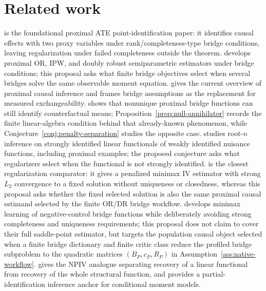 \documentclass[11pt]{article}
\theoremstyle{definition}
\theoremstyle{plain}
\theoremstyle{remark}
\begin{document}
\section{Related work}
\citet{MiaoGengTchetgen2018Biometrika} is the foundational proximal ATE
point-identification paper: it identifies causal effects with two proxy
variables under rank/completeness-type bridge conditions, leaving
regularization under failed completeness outside the theorem.
\citet{CuiPuShiMiaoTchetgen2024JASA} develops proximal OR, IPW, and doubly
robust semiparametric estimators under bridge conditions; this proposal asks
what finite bridge objectives select when several bridges solve the same observable
moment equation.  \citet{TchetgenYingCuiShiMiao2024StatSci} gives the current
overview of proximal causal inference and frames bridge assumptions as the
replacement for measured exchangeability.  \citet{ZhangLiMiaoTchetgen2023SPL}
shows that nonunique proximal bridge functions can still identify
counterfactual means; Proposition~\ref{prop:null-annihilator} records the
finite linear-algebra condition behind that already-known phenomenon, while
Conjecture~\ref{conj:penalty-separation} studies the opposite case.
\citet{BennettKallusMaoNeweySyrgkanisUehara2023COLT} studies root-\(n\)
inference on strongly identified linear functionals of weakly identified
nuisance functions, including proximal examples; the proposed conjecture
asks what regularizers select when the functional is not strongly identified.
\citet{BennettKallusMaoNeweySyrgkanisUehara2023MinimaxIV} is the closest
regularization comparator: it gives a penalized minimax IV estimator with
strong \(L_2\) convergence to a fixed solution without uniqueness or
closedness, whereas this proposal asks whether the fixed selected solution is
also the same proximal causal estimand selected by the finite OR/DR bridge
workflow.
\citet{KallusMaoUehara2021MinimaxNC} develops minimax learning of
negative-control bridge functions while deliberately avoiding strong
completeness and uniqueness requirements; this proposal does not claim to
cover their full saddle-point estimator, but targets the population causal
object selected when a finite bridge dictionary and finite critic class
reduce the profiled bridge subproblem to the quadratic matrices
\((B_P,c_P,R_P)\) in Assumption~\ref{ass:native-workflow}.
\citet{Santos2011JoE} gives the NPIV analogue separating recovery of a
linear functional from recovery of the whole structural function, and
\citet{Santos2012Econometrica} provides a partial-identification inference
anchor for conditional moment models.  \citet{GhassamiShpitserTchetgen2023ProxyPI}
\end{document}
